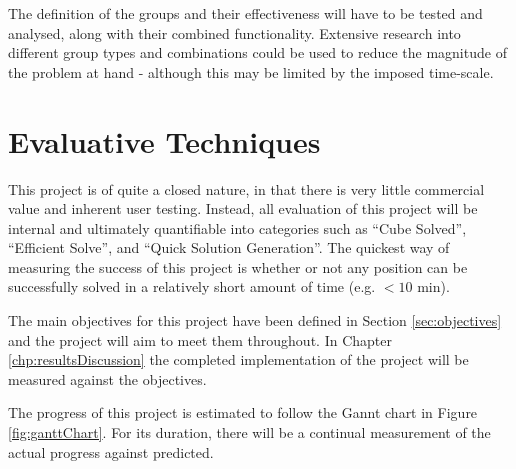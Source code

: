 \documentclass{report}
\begin{document}
    The definition of the groups and their effectiveness will have to be tested and analysed, along with their combined functionality. Extensive research into different group types and combinations could be used to reduce the magnitude of the problem at hand - although this may be limited by the imposed time-scale.
    
    \section{Evaluative Techniques} \label{sec:evalTechniques}
    
    This project is of quite a closed nature, in that there is very little commercial value and inherent user testing. Instead, all evaluation of this project will be internal and ultimately quantifiable into categories such as \enquote{Cube Solved}, \enquote{Efficient Solve}, and \enquote{Quick Solution Generation}. The quickest way of measuring the success of this project is whether or not any position can be successfully solved in a relatively short amount of time (e.g. $<10$ \si{\minute}). 
    
    The main objectives for this project have been defined in Section \ref{sec:objectives} and the project will aim to meet them throughout. In Chapter \ref{chp:resultsDiscussion} the completed implementation of the project will be measured against the objectives.
    
    The progress of this project is estimated to follow the Gannt chart in Figure \ref{fig:ganttChart}. For its duration, there will be a continual measurement of the actual progress against predicted.
    
\end{document}
